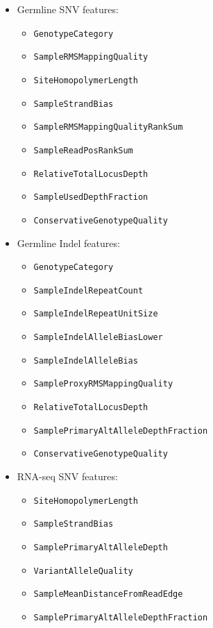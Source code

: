 \documentclass{article}
\begin{document}
\begin{itemize}
    \item Germline SNV features:
    \begin{itemize}
        \item \texttt{GenotypeCategory}
        \item \texttt{SampleRMSMappingQuality}
        \item \texttt{SiteHomopolymerLength}
        \item \texttt{SampleStrandBias}
        \item \texttt{SampleRMSMappingQualityRankSum}
        \item \texttt{SampleReadPosRankSum}
        \item \texttt{RelativeTotalLocusDepth}
        \item \texttt{SampleUsedDepthFraction}
        \item \texttt{ConservativeGenotypeQuality}
    \end{itemize}
    \item Germline Indel features:
    \begin{itemize}
        \item \texttt{GenotypeCategory}
        \item \texttt{SampleIndelRepeatCount}
        \item \texttt{SampleIndelRepeatUnitSize}
        \item \texttt{SampleIndelAlleleBiasLower}
        \item \texttt{SampleIndelAlleleBias}
        \item \texttt{SampleProxyRMSMappingQuality}
        \item \texttt{RelativeTotalLocusDepth}
        \item \texttt{SamplePrimaryAltAlleleDepthFraction}
        \item \texttt{ConservativeGenotypeQuality}
    \end{itemize}
    \item RNA-seq SNV features:
    \begin{itemize}
        \item \texttt{SiteHomopolymerLength}
        \item \texttt{SampleStrandBias}
        \item \texttt{SamplePrimaryAltAlleleDepth}
        \item \texttt{VariantAlleleQuality}
        \item \texttt{SampleMeanDistanceFromReadEdge}
        \item \texttt{SamplePrimaryAltAlleleDepthFraction}

\end{itemize}
\end{itemize}
\end{document}

